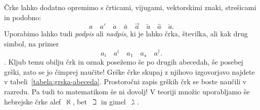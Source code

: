 Črke lahko dodatno opremimo s črticami, vijugami, vektorskimi znaki, strešicami in podobno:
%
\begin{equation*}
 a \quad
 a' \quad
 \dot{a} \quad
 \bar{a} \quad
 \vec{a} \quad
 \tilde{a} \quad
 \hat{a} \quad
 \check{a}.
\end{equation*}
%
Uporabimo lahko tudi \emph{podpis} ali
\emph{nadpis}, ki je lahko črka, številka, ali kak drug simbol, na primer
%
\begin{equation*}
  a_i \quad
  a^i \quad
  a_1 \quad
  a_{\star} \quad
  a^{\dagger}.
\end{equation*}
%
. Kljub temu obilju črk in oznak posežemo še po drugih abecedah, še posebej grški, zato
se jo čimprej naučite! Grške črke skupaj z njihovo izgovorjavo najdete v
tabeli~\ref{tabela:grska-abeceda}. Prostoročni zapis grških črk se boste naučili v
razredu.
%
Pa tudi to matematikom še ni dovolj! V teoriji množic uporabljamo še hebrejske črke
alef~$\aleph$, bet~$\beth$ in gimel~$\gimel$.

